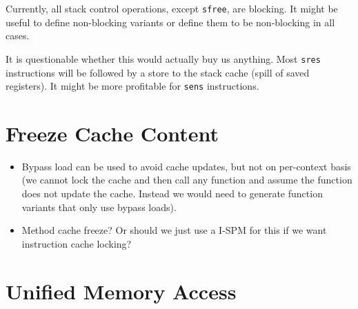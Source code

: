 \documentclass[a4paper,fontsize=10pt,twoside,DIV15,BCOR12mm,headinclude=true,footinclude=false,pagesize,bibtotoc]{scrbook}
\newcommand{\comment}[3]{

\textsf{\textbf{#1}} {\color{#3}#2}}
\newcommand{\martin}[1]{\comment{Martin}{#1}{Blue}}
\newcommand{\stefan}[1]{\comment{Stefan}{#1}{RoyalPurple}}
\renewcommand{\martin}[1]{}
\renewcommand{\stefan}[1]{}
\begin{document}
Currently, all stack control operations, except \texttt{sfree}, are blocking. It
might be useful to define non-blocking variants or define them to be
non-blocking in all cases.

It is questionable whether this would actually buy us anything. Most
\texttt{sres} instructions will be followed by a store to the stack cache
(spill of saved registers). It might be more profitable for \texttt{sens}
instructions.

\section{Freeze Cache Content}

\begin{itemize}
  \item Bypass load can be used to avoid cache updates, but not on per-context basis (we cannot lock the cache and then call any function
  and assume the function does not update the cache. Instead we would need to generate function variants that only use bypass loads).
  \item Method cache freeze? Or should we just use a I-SPM for this if we want instruction cache locking?
\end{itemize}

\section{Unified Memory Access}

\stefan{All our memories (except the stack cache) use a unified address space, but due to the typed loads, references must include both address and
type of the cache. Since the type is encoded in the code, any generated code can only use one type of cache or SPM.
If we have a function with $m$ arguments and $n$ different caches or ways of accessing
memory, in the worst case we would need $m^n$ copies of that function to handle all cases (increases instruction cache costs!). We also need to expose this to the programmer,
either through having different names for the functions (very ugly and annoying to use, remember that this is transitive, you need to copy
your whole libraries!), or by having a type system on top of the C types, which means implementing some sort of overloading in C and
auto-generating variants of functions.

Note: we need typed loads to tell the processor which cache (not) to use. We also need a shadow stack not only due to typed loads,
but also due to the write-back policy of the stack cache (would make consistency a night-mare if we would allow to access stack-cache
allocated data over the data cache!).
}
\martin{we discussed that issue in The Vienna mini workshop and should continue to discuss it.}
\end{document}
